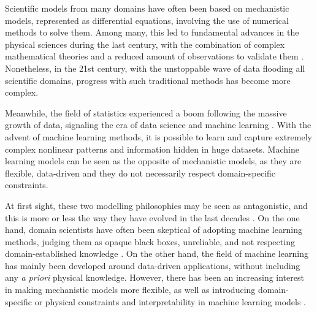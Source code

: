 
Scientific models from many domains have often been based on mechanistic models, represented as differential equations, involving the use of numerical methods to solve them. 
Among many, this led to fundamental advances in the physical sciences during the last century, with the combination of complex mathematical theories and a reduced amount of observations to validate them
\cite{Wigner.1960, Rude:2018jv}. 
Nonetheless, in the 21st century, with the unstoppable wave of data flooding all scientific domains, progress with such traditional methods has become more complex. 

Meanwhile, the field of statistics experienced a boom following the massive growth of data, signaling the era of data science and machine learning \cite{Cox:2017hv}.
With the advent of machine learning methods, it is possible to learn and capture extremely complex nonlinear patterns and information hidden in huge datasets. 
Machine learning models can be seen as the opposite of mechanistic models, as they are flexible, data-driven and they do not necessarily respect domain-specific constraints.

At first sight, these two modelling philosophies may be seen as antagonistic, and this is more or less the way they have evolved in the last decades \cite{zdeborova_understanding_2020}. 
On the one hand, domain scientists have often been skeptical of adopting machine learning methods, judging them as opaque black boxes, unreliable, and not respecting domain-established knowledge \cite{Coveney:2016eb}.
On the other hand, the field of machine learning has mainly been developed around data-driven applications, without including any \textit{a priori} physical knowledge. 
However, there has been an increasing interest in making mechanistic models more flexible, as well as introducing domain-specific or physical constraints and interpretability in machine learning models \cite{Molnar.2020sisk,Rudin.2022}.

